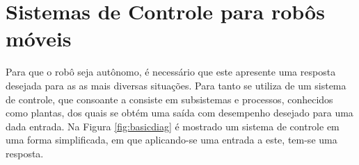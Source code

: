 \vspace{1cm}
\section{Sistemas de Controle para robôs móveis} \label{cap:controle}

Para que o robô seja autônomo, %
é necessário que este apresente uma resposta desejada para as 
as mais diversas situações. 
Para tanto se utiliza de um sistema de controle, que consoante a  consiste em subsistemas e 
processos, conhecidos como plantas, dos quais se obtém uma saída com desempenho desejado para uma dada entrada. Na Figura 
\ref{fig:basicdiag} é mostrado um sistema de controle em uma forma simplificada, em que aplicando-se uma entrada a este, tem-se uma 
resposta.

